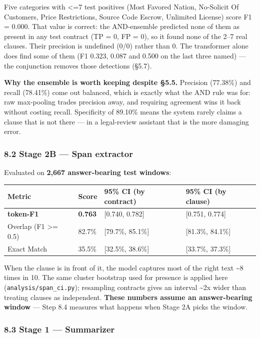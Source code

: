 \documentclass[
  10pt,
]{article}
\begin{document}
Five categories with \textless=7 test positives (Most Favored Nation, No-Solicit
Of Customers, Price Restrictions, Source Code Escrow, Unlimited License) score
F1 = 0.000. That value is correct: the AND-ensemble predicted none of them as
present in any test contract (TP = 0, FP = 0), so it found none of the 2--7 real
clauses. Their precision is undefined (0/0) rather than 0. The transformer alone
does find some of them (F1 0.323, 0.087 and 0.500 on the last three named) ---
the conjunction removes those detections (§5.7).

\textbf{Why the ensemble is worth keeping despite §5.5.} Precision (77.38\%) and
recall (78.41\%) come out balanced, which is exactly what the AND rule was for:
raw max-pooling trades precision away, and requiring agreement wins it back
without costing recall. Specificity of 89.10\% means the system rarely claims a
clause that is not there --- in a legal-review assistant that is the more
damaging error.

\subsubsection{8.2 Stage 2B --- Span extractor}

Evaluated on \textbf{2,667 answer-bearing test windows}:

\begin{longtable}[]{@{}llll@{}}
\toprule
Metric & Score & 95\% CI (by contract) & 95\% CI (by clause) \\
\midrule
\endhead
\textbf{token-F1} & \textbf{0.763} & {[}0.740, 0.782{]} & {[}0.751, 0.774{]} \\
Overlap (F1 \textgreater= 0.5) & 82.7\% & {[}79.7\%, 85.1\%{]} & {[}81.3\%,
84.1\%{]} \\
Exact Match & 35.5\% & {[}32.5\%, 38.6\%{]} & {[}33.7\%, 37.3\%{]} \\
\bottomrule
\end{longtable}

When the clause is in front of it, the model captures most of the right text
\textasciitilde8 times in 10. The same cluster bootstrap used for presence is
applied here (\texttt{analysis/span\_ci.py}); resampling contracts gives an
interval \textasciitilde2x wider than treating clauses as independent.
\textbf{These numbers assume an answer-bearing window} --- Step 8.4 measures
what happens when Stage 2A picks the window.

\subsubsection{8.3 Stage 1 --- Summarizer}
\end{document}
